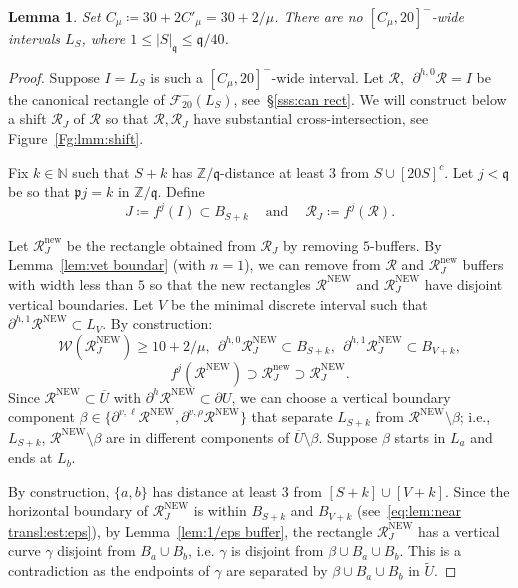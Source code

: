 \documentclass{amsart}
\renewcommand{\sp}{{\ \ }}
\newcommand{\1}{{\mathbb 1 }}
\newcommand{\Fam}{{\mathcal F}}
\newcommand{\Width}{{\mathcal W}}
\newcommand{\epscasc}{{\mu}}
\newcommand\RR{\mathcal{R}}
\newcommand{\pp}{\mathfrak{p}}
\newcommand{\qq}{\mathfrak{q}}
\newcommand\new{{\operatorname{new}}}
\newcommand\NEW{{\operatorname{NEW}}}
\newcommand{\N}{\mathbb{N}}
\newcommand{\Z}{\mathbb{Z}}
\newtheorem{lem}[thm]{Lemma}
\theoremstyle{remark}
\numberwithin{equation}{section}
\theoremstyle{definition}
\begin{document}
\begin{lem}
\label{lem:near transl:est:eps}
Set $C_\epscasc\coloneqq 30+ 2C'_\epscasc =30+2/\epscasc$. There are no  $[C_\epscasc,20]^-$-wide intervals $L_S$, where $1\le |S|_\qq \le \qq/40$.
\end{lem}
\begin{proof}
 Suppose $I=L_S$ is such a $[C_\epscasc,20]^-$-wide interval. Let $\RR,\sp  \partial^{h,0}\RR=I$ be the canonical rectangle of $\Fam^-_{20}(L_S)$, see~\S\ref{sss:can rect}. We will construct below a shift $\RR_J$ of $\RR$ so that $\RR,\RR_J$ have substantial cross-intersection,  see Figure~\ref{Fg:lmm:shift}. 

Fix $k\in \N$ such that $S+k$ has $\Z/\qq$-distance at least $3$ from $S\cup [20 S]^c$. Let $j < \qq $ be so that $\pp j= k$ in $\Z/\qq$. Define \[J\coloneqq f^{j}(I)\subset B_{S+k}\sp\sp \text{ and }\sp\sp 
\RR_J\coloneqq f^j (\RR).
\]

Let $\RR_J^\new$ be the rectangle obtained from $\RR_J$ by removing $5$-buffers. By Lemma~\ref{lem:vet boundar} (with $n=1$), we can remove from $\RR$ and $\RR_J^\new$ buffers with width less than $5$ so that the new rectangles $\RR^\NEW$ and $\RR_J^\NEW$ have disjoint vertical boundaries. Let $V$ be the minimal discrete interval such that $\partial^{h,1}\RR^\NEW \subset L_V$. By construction:
\begin{equation}
\label{eq:lem:near transl:est:eps}
\Width\left(\RR^\NEW_J\right)\ge 10 +2/\mu, \sp\partial^{h,0}\RR_J^\NEW \subset B_{S+k},\sp \partial^{h,1}\RR_J^\NEW\subset B_{V+k}, 
\end{equation}
\[
 f^j\left(\RR^\NEW\right)\supset \RR_J^\new \supset \RR^\NEW_J.\]
 Since $\RR^\NEW\subset \overline U$ with $\partial ^h \RR^\NEW \subset \partial U$, we can choose a vertical boundary component $\beta \in \{\partial ^{v,\ell} \RR^\NEW, \partial ^{v,\rho} \RR^\NEW \}$ that separate $L_{S+k}$ from $\RR^\NEW\setminus \beta$; i.e., $L_{S+k}$, $\RR^\NEW \setminus \beta$  are in different components of $\overline U\setminus \beta $. Suppose $\beta$ starts in $L_a$ and ends at $L_b$. 

By construction, $\{a,b\}$ has distance at least $3$ from $[S+k]\cup [V+k]$. Since the horizontal boundary of $\RR_J^\NEW$ is within $B_{S+k}$ and $B_{V+k}$  (see~\eqref{eq:lem:near transl:est:eps}), by Lemma~\ref{lem:1/eps buffer}, the rectangle $\RR_J^\NEW$ has a vertical curve $\gamma$ disjoint from $B_a\cup B_b$, i.e. $\gamma$ is disjoint from $\beta\cup B_a\cup B_b $. This is a contradiction as the endpoints of $\gamma$ are separated by $\beta\cup B_a\cup B_b $ in $\widetilde U$.
\end{proof}
\end{document}
